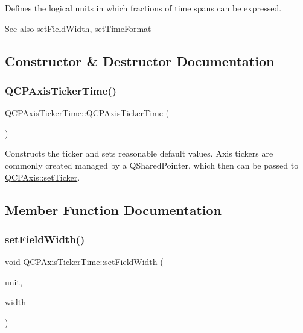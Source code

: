 Defines the logical units in which fractions of time spans can be expressed.

\begin{DoxySeeAlso}{See also}
\mbox{\hyperlink{class_q_c_p_axis_ticker_time_adc13e54fc969be98a5c0e3fa0dbaa293}{set\+Field\+Width}}, \mbox{\hyperlink{class_q_c_p_axis_ticker_time_a2f30b6e5125bce4256be9ce3177088ea}{set\+Time\+Format}} 
\end{DoxySeeAlso}


\subsection{Constructor \& Destructor Documentation}
\mbox{\label{class_q_c_p_axis_ticker_time_a5145aac1d2117fdac411d9e8552cc41b}} 
\subsubsection{\texorpdfstring{Q\+C\+P\+Axis\+Ticker\+Time()}{QCPAxisTickerTime()}}
{\footnotesize\ttfamily Q\+C\+P\+Axis\+Ticker\+Time\+::\+Q\+C\+P\+Axis\+Ticker\+Time (\begin{DoxyParamCaption}{ }\end{DoxyParamCaption})}

Constructs the ticker and sets reasonable default values. Axis tickers are commonly created managed by a Q\+Shared\+Pointer, which then can be passed to \mbox{\hyperlink{class_q_c_p_axis_a4ee03fcd2c74d05cd1a419b9af5cfbdc}{Q\+C\+P\+Axis\+::set\+Ticker}}. 

\subsection{Member Function Documentation}
\mbox{\label{class_q_c_p_axis_ticker_time_adc13e54fc969be98a5c0e3fa0dbaa293}} 
\subsubsection{\texorpdfstring{set\+Field\+Width()}{setFieldWidth()}}
{\footnotesize\ttfamily void Q\+C\+P\+Axis\+Ticker\+Time\+::set\+Field\+Width (\begin{DoxyParamCaption}\item[{\mbox{\hyperlink{class_q_c_p_axis_ticker_time_a5c48ded8c6d3a1aca9b68219469fea3e}{Q\+C\+P\+Axis\+Ticker\+Time\+::\+Time\+Unit}}}]{unit,  }\item[{int}]{width }\end{DoxyParamCaption})}

